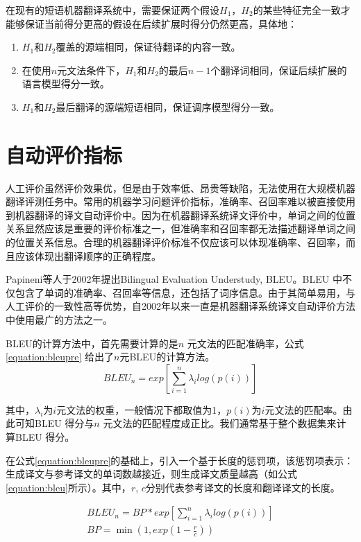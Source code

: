\documentclass[master, winfont]{njuthesis}
\begin{document}
在现有的短语机器翻译系统中，需要保证两个假设$H_1$，$H_2$的某些特征完全一致才能够保证当前得分更高的假设在后续扩展时得分仍然更高，具体地：
\begin{enumerate}
  \item $H_1$和$H_2$覆盖的源端相同，保证待翻译的内容一致。
  \item 在使用$n$元文法条件下，$H_1$和$H_2$的最后$n-1$个翻译词相同，保证后续扩展的语言模型得分一致。
  \item $H_1$和$H_2$最后翻译的源端短语相同，保证调序模型得分一致。
\end{enumerate}

\section{自动评价指标}
\label{section:measurement}
人工评价虽然评价效果优，但是由于效率低、昂贵等缺陷，无法使用在大规模机器翻译评测任务中。常用的机器学习问题评价指标，准确率、召回率难以被直接使用到机器翻译的译文自动评价中。因为在机器翻译系统译文评价中，单词之间的位置关系显然应该是重要的评价标准之一，但准确率和召回率都无法描述翻译单词之间的位置关系信息。合理的机器翻译评价标准不仅应该可以体现准确率、召回率，而且应该体现出翻译顺序的正确程度。

Papineni等人\cite{papineni2002bleu}于2002年提出Bilingual Evaluation Understudy, BLEU。BLEU 中不仅包含了单词的准确率、召回率等信息，还包括了词序信息。由于其简单易用，与人工评价的一致性高等优势，自2002年以来一直是机器翻译系统译文自动评价方法中使用最广的方法之一。

BLEU的计算方法中，首先需要计算的是$n$ 元文法的匹配准确率，公式\ref{equation:bleupre} 给出了$n$元BLEU的计算方法。
\begin{equation}
  \label{equation:bleupre}
  BLEU_n = exp[\sum_{i=1}^n\lambda_ilog(p(i))]
\end{equation}

其中，$\lambda_i$为$i$元文法的权重，一般情况下都取值为1，$p(i)$为$i$元文法的匹配率。由此可知BLEU 得分与$n$ 元文法的匹配程度成正比。我们通常基于整个数据集来计算BLEU 得分。

在公式\ref{equation:bleupre}的基础上，引入一个基于长度的惩罚项，该惩罚项表示：生成译文与参考译文的单词数越接近，则生成译文质量越高（如公式\ref{equation:bleu}所示）。其中，$r$, $c$分别代表参考译文的长度和翻译译文的长度。

\begin{equation}
  \label{equation:bleu}
    \begin{aligned}
  BLEU_n=BP*exp[\sum_{i=1}^n\lambda_ilog(p(i))]\\
  BP=\min(1,exp(1-\frac{r}{c}))
  \end{aligned}
\end{equation}
\end{document}
